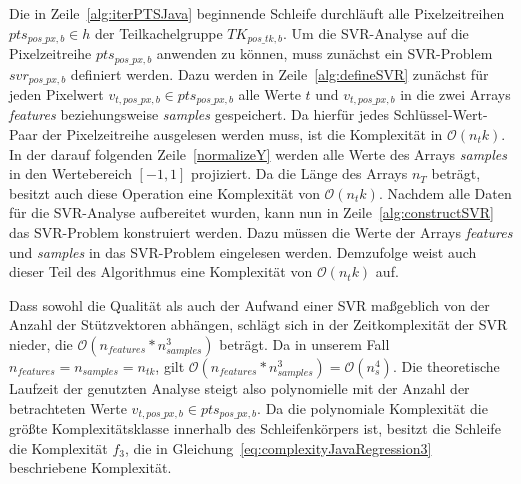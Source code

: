 Die in Zeile~\ref{alg:iterPTSJava} beginnende Schleife durchläuft alle Pixelzeitreihen $pts_{pos\_px, b} \in h$ der Teilkachelgruppe $TK_{pos\_tk, b}$. Um die SVR-Analyse auf die Pixelzeitreihe $pts_{pos\_px, b}$ anwenden zu können, muss zunächst ein SVR-Problem $svr_{pos\_{px}, b}$ definiert werden. Dazu werden in Zeile~\ref{alg:defineSVR} zunächst für jeden Pixelwert $v_{t, pos\_px, b} \in pts_{pos\_px, b}$ alle Werte $t$ und $v_{t, pos\_px, b}$ in die zwei Arrays \textit{features} beziehungsweise \textit{samples} gespeichert. Da hierfür jedes Schlüssel-Wert-Paar der Pixelzeitreihe ausgelesen werden muss, ist die Komplexität in $\mathcal{O}(n_tk)$. In der darauf folgenden Zeile~\ref{normalizeY} werden alle Werte des Arrays \textit{samples } in den Wertebereich $[-1, 1]$ projiziert. Da die Länge des Arrays $n_T$ beträgt, besitzt auch diese Operation eine Komplexität von $\mathcal{O}(n_tk)$. Nachdem alle Daten für die SVR-Analyse aufbereitet wurden, kann nun in Zeile~\ref{alg:constructSVR} das SVR-Problem konstruiert werden. Dazu müssen die Werte der Arrays \textit{features} und \textit{samples} in das SVR-Problem eingelesen werden. Demzufolge weist auch dieser Teil des Algorithmus eine Komplexität von $\mathcal{O}(n_tk)$ auf.

Dass sowohl die Qualität als auch der Aufwand einer SVR maßgeblich von der Anzahl der Stützvektoren abhängen, schlägt sich in der Zeitkomplexität der SVR nieder, die $\mathcal{O}(n_{features} * n_{samples}^3)$ beträgt. Da in unserem Fall $n_{features} = n_{samples} = n_{tk}$, gilt $\mathcal{O}(n_{features} * n_{samples}^3) = \mathcal{O}(n_{s}^4)$. Die theoretische Laufzeit der genutzten Analyse steigt also polynomielle mit der Anzahl der betrachteten Werte  $v_{t, pos\_px, b} \in pts_{pos\_px, b}$. Da die polynomiale Komplexität die größte Komplexitätsklasse innerhalb des Schleifenkörpers ist, besitzt die Schleife die Komplexität $f_3$, die in Gleichung~\ref{eq:complexityJavaRegression3} beschriebene Komplexität.

